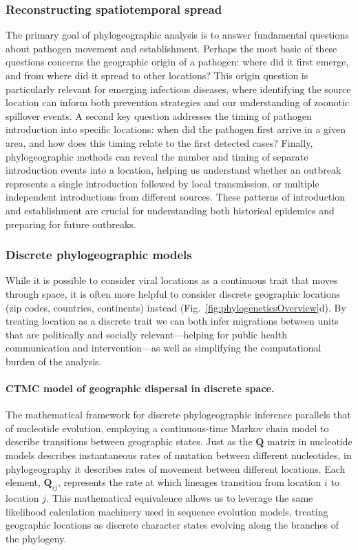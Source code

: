 \subsubsection{Reconstructing spatiotemporal spread}
The primary goal of phylogeographic analysis is to answer fundamental questions about pathogen movement and establishment.
Perhaps the most basic of these questions concerns the geographic origin of a pathogen: where did it first emerge, and from where did it spread to other locations?
This origin question is particularly relevant for emerging infectious diseases, where identifying the source location can inform both prevention strategies and our understanding of zoonotic spillover events.
A second key question addresses the timing of pathogen introduction into specific locations: when did the pathogen first arrive in a given area, and how does this timing relate to the first detected cases?
Finally, phylogeographic methods can reveal the number and timing of separate introduction events into a location, helping us understand whether an outbreak represents a single introduction followed by local transmission, or multiple independent introductions from different sources.
These patterns of introduction and establishment are crucial for understanding both historical epidemics and preparing for future outbreaks.

\subsubsection{Discrete phylogeographic models}
While it is possible to consider viral locations as a continuous trait that moves through space, it is often more helpful to consider discrete geographic locations (zip codes, countries, continents) instead (Fig.~\ref{fig:phylogeneticsOverview}d).
By treating location as a discrete trait we can both infer migrations between units that are politically and socially relevant---helping for public health communication and intervention---as well as simplifying the computational burden of the analysis.

\paragraph*{CTMC model of geographic dispersal in discrete space.}
The mathematical framework for discrete phylogeographic inference parallels that of nucleotide evolution, employing a continuous-time Markov chain model to describe transitions between geographic states.
Just as the $\mathbf{Q}$ matrix in nucleotide models describes instantaneous rates of mutation between different nucleotides, in phylogeography it describes rates of movement between different locations.
Each element, $\mathbf{Q}_{ij}$, represents the rate at which lineages transition from location $i$ to location $j$.
This mathematical equivalence allows us to leverage the same likelihood calculation machinery used in sequence evolution models, treating geographic locations as discrete character states evolving along the branches of the phylogeny.

